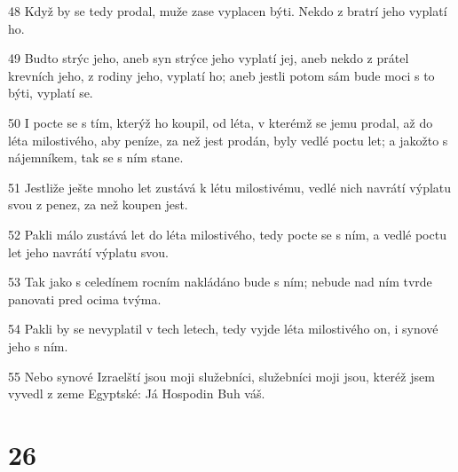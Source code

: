 \par 48 Když by se tedy prodal, muže zase vyplacen býti. Nekdo z bratrí jeho vyplatí ho.
\par 49 Budto strýc jeho, aneb syn strýce jeho vyplatí jej, aneb nekdo z prátel krevních jeho, z rodiny jeho, vyplatí ho; aneb jestli potom sám bude moci s to býti, vyplatí se.
\par 50 I pocte se s tím, kterýž ho koupil, od léta, v kterémž se jemu prodal, až do léta milostivého, aby peníze, za než jest prodán, byly vedlé poctu let; a jakožto s nájemníkem, tak se s ním stane.
\par 51 Jestliže ješte mnoho let zustává k létu milostivému, vedlé nich navrátí výplatu svou z penez, za než koupen jest.
\par 52 Pakli málo zustává let do léta milostivého, tedy pocte se s ním, a vedlé poctu let jeho navrátí výplatu svou.
\par 53 Tak jako s celedínem rocním nakládáno bude s ním; nebude nad ním tvrde panovati pred ocima tvýma.
\par 54 Pakli by se nevyplatil v tech letech, tedy vyjde léta milostivého on, i synové jeho s ním.
\par 55 Nebo synové Izraelští jsou moji služebníci, služebníci moji jsou, kteréž jsem vyvedl z zeme Egyptské: Já Hospodin Buh váš.

\chapter{26}

